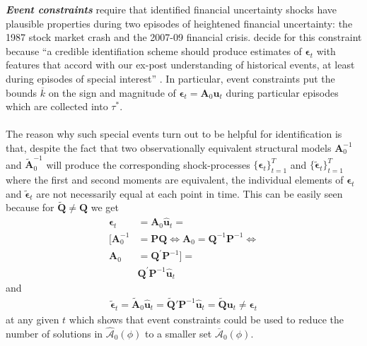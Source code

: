 \documentclass[a4paper,11pt,listof=nochaptergap,oneside,pointednumbers,bibtotoc,bigheadings,liststotoc]{scrbook}
\theoremstyle{mysatz}
\theoremstyle{mydefinition}
\theoremstyle{mytheorem}
\theoremstyle{mybemerkung}
\let\oldhat\hat
\newcommand{\vect}[1]{\boldsymbol{\mathbf{#1}}}
\newcommand{\hatt}[1]{\oldhat{\boldsymbol{\mathbf{#1}}}}
\begin{document}
\textbf{\textit{Event constraints}} require that identified financial uncertainty shocks have plausible properties during two episodes of heightened financial uncertainty: the 1987 stock market crash and the 2007-09 financial crisis. \citet{ludvigsonetal:18} decide for this constraint because ``a credible identifiation scheme should produce estimates of $\vect{\epsilon}_t$ with features that accord with our ex-post understanding of historical events, at least during episodes of special interest'' \citep[p. 7]{ludvigsonetal:18}.  In particular, event constraints put the bounds $\overline{k}$ on the sign and magnitude of $\vect{\epsilon}_t = \vect{A}_0\vect{u}_t$ during particular episodes which are collected into $\tau^*$. \\
\\
The reason why such special events turn out to be helpful for identification is that, despite the fact that two observationally equivalent structural models $\vect{A}_0^{-1}$ and $\widetilde{\vect{A}}_0^{-1}$ will produce the corresponding shock-processes $\big\{\vect{\epsilon}_t\big\}_{t=1}^T$ and $\big\{\widetilde{\vect{\epsilon}}_t\big\}_{t=1}^T$ where the first and second moments are equivalent, the individual elements of $\vect{\epsilon}_t$ and $\widetilde{\vect{\epsilon}}_t$ are not necessarily equal at each point in time. This can be easily seen because for $\widetilde{\vect{Q}} \neq \vect{Q}$ we get 
\begin{equation} \label{eq:svar_ludvi9}
\begin{split}
\vect{\epsilon}_t & = \vect{A}_0\hatt{\vect{u}}_t = \\
[\vect{A}_0^{-1} & = \vect{P}\vect{Q} \iff \vect{A}_0 = \vect{Q}^{-1}\vect{P}^{-1} \iff \\
\vect{A}_0 & = \vect{Q}^{'}\vect{P}^{-1}] = \\
	& \vect{Q}^'\vect{P}^{-1}\hatt{\vect{u}}_t 
\end{split}								
\end{equation}
and 
\begin{equation} \label{eq:svar_ludvi10}
\begin{split}
\widetilde{\vect{\epsilon}}_t = \widetilde{\vect{A}}_0\hatt{\vect{u}}_t = \widetilde{\vect{Q}}'\vect{P}^{-1}\hatt{\vect{u}}_t = \widetilde{\vect{Q}}\vect{u}_t \neq \vect{\epsilon}_t
\end{split}								
\end{equation}
at any given $t$ which shows that event constraints could be used to reduce the number of solutions in $\hatt{\mathcal{A}}_0(\phi)$ to a smaller set $\overline{\vect{\mathcal{A}}}_0(\phi)$. \\
\end{document}
